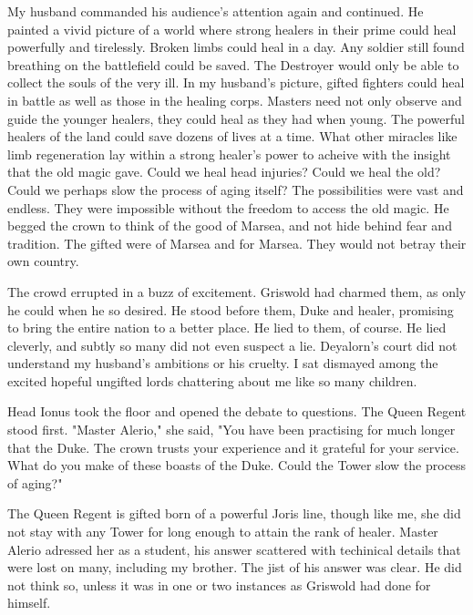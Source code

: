 \documentclass{article}
\begin{document}
My husband commanded his audience's attention again and continued. He painted a vivid picture of a world where strong healers in their prime could heal powerfully and tirelessly. Broken limbs could heal in a day. Any soldier still found breathing on the battlefield could be saved. The Destroyer would only be able to collect the souls of the very ill. In my husband's picture, gifted fighters could heal in battle as well as those in the healing corps. Masters need not only observe and guide the younger healers, they could heal as they had when young. The powerful healers of the land could save dozens of lives at a time. What other miracles like limb regeneration lay within a strong healer's power to acheive with the insight that the old magic gave. Could we heal head injuries? Could we heal the old? Could we perhaps slow the process of aging itself? The possibilities were vast and endless. They were impossible without the freedom to access the old magic. He begged the crown to think of the good of Marsea, and not hide behind fear and tradition. The gifted were of Marsea and for Marsea. They would not betray their own country. 

The crowd errupted in a buzz of excitement. Griswold had charmed them, as only he could when he so desired. He stood before them, Duke and healer, promising to bring the entire nation to a better place. He lied to them, of course. He lied cleverly, and subtly so many did not even suspect a lie. Deyalorn's court did not understand my husband's ambitions or his cruelty. I sat dismayed among the excited hopeful ungifted lords chattering about me like so many children. 

Head Ionus took the floor and opened the debate to questions. The Queen Regent stood first. "Master Alerio," she said, "You have been practising for much longer that the Duke. The crown trusts your experience and it grateful for your service. What do you make of these boasts of the Duke. Could the Tower slow the process of aging?"

The Queen Regent is gifted born of a powerful Joris line, though like me, she did not stay with any Tower for long enough to attain the rank of healer. Master Alerio adressed her as a student, his answer scattered with techinical details that were lost on many, including my brother. The jist of his answer was clear. He did not think so, unless it was in one or two instances as Griswold had done for himself.
\end{document}
